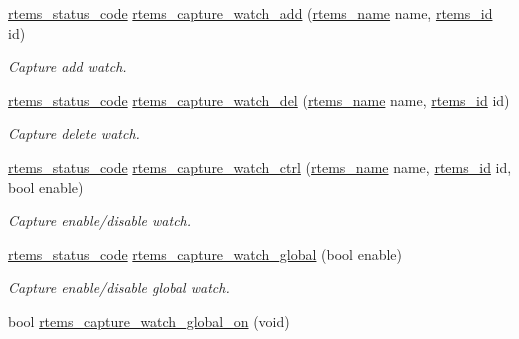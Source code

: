 \begin{DoxyCompactItemize}
\item 
\mbox{\hyperlink{group__ClassicStatus_ga545d41846817eaba6143d52ee4d9e9fe}{rtems\+\_\+status\+\_\+code}} \mbox{\hyperlink{group__libmisc__capture_ga3fc5d24ef1f172fa8ca08ca50a6058ba}{rtems\+\_\+capture\+\_\+watch\+\_\+add}} (\mbox{\hyperlink{group__ClassicTasks_ga55fb63c49f68c0cbd9bee004da15b1fd}{rtems\+\_\+name}} name, \mbox{\hyperlink{group__ClassicTasks_gab20892b814dced7dd4e5b9bf42becd57}{rtems\+\_\+id}} id)
\begin{DoxyCompactList}\small\item\em Capture add watch. \end{DoxyCompactList}\item 
\mbox{\hyperlink{group__ClassicStatus_ga545d41846817eaba6143d52ee4d9e9fe}{rtems\+\_\+status\+\_\+code}} \mbox{\hyperlink{group__libmisc__capture_gaa61457ceadb0c2e77897e41790c22a7c}{rtems\+\_\+capture\+\_\+watch\+\_\+del}} (\mbox{\hyperlink{group__ClassicTasks_ga55fb63c49f68c0cbd9bee004da15b1fd}{rtems\+\_\+name}} name, \mbox{\hyperlink{group__ClassicTasks_gab20892b814dced7dd4e5b9bf42becd57}{rtems\+\_\+id}} id)
\begin{DoxyCompactList}\small\item\em Capture delete watch. \end{DoxyCompactList}\item 
\mbox{\hyperlink{group__ClassicStatus_ga545d41846817eaba6143d52ee4d9e9fe}{rtems\+\_\+status\+\_\+code}} \mbox{\hyperlink{group__libmisc__capture_gaf369469774923c9fc482937aec6ca34f}{rtems\+\_\+capture\+\_\+watch\+\_\+ctrl}} (\mbox{\hyperlink{group__ClassicTasks_ga55fb63c49f68c0cbd9bee004da15b1fd}{rtems\+\_\+name}} name, \mbox{\hyperlink{group__ClassicTasks_gab20892b814dced7dd4e5b9bf42becd57}{rtems\+\_\+id}} id, bool enable)
\begin{DoxyCompactList}\small\item\em Capture enable/disable watch. \end{DoxyCompactList}\item 
\mbox{\hyperlink{group__ClassicStatus_ga545d41846817eaba6143d52ee4d9e9fe}{rtems\+\_\+status\+\_\+code}} \mbox{\hyperlink{group__libmisc__capture_gaed2ce2569738d1553944c6cbf63717a5}{rtems\+\_\+capture\+\_\+watch\+\_\+global}} (bool enable)
\begin{DoxyCompactList}\small\item\em Capture enable/disable global watch. \end{DoxyCompactList}\item 
bool \mbox{\hyperlink{group__libmisc__capture_ga59613c1b9451ff9fc8d15cf9ecb5bb98}{rtems\+\_\+capture\+\_\+watch\+\_\+global\+\_\+on}} (void)

\end{DoxyCompactItemize}

